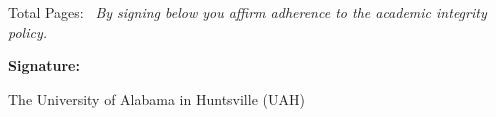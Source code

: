 \documentclass[11pt,letterpaper]{article}
\newcommand{\course}{CPE 487/587}
\newcommand{\coursename}{Deep Learning for Engineering Applications}
\newcommand{\examnum}{Examination 1 Sample}
\newcommand{\examdate}{February 26, 2026}
\begin{document}
\vspace{0.1cm}
\begin{center}
  \color{SlateGray}\small
  Total Pages:\ \textbf{\pageref{LastPage}}
  \quad\textbullet\quad
  \textit{By signing below you affirm adherence to the academic integrity policy.}
\end{center}
\begin{center}
  {\color{NavyMid}\bfseries Signature:}\quad\underline{\hspace{8cm}}
  
  \vspace{0.1cm}
  
{  \color{SlateGray}\small The University of Alabama in Huntsville (UAH)}
  
\end{center}

%
%
%
\end{document}
